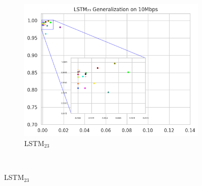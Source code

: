 \documentclass[a4paper,fleqn]{cas-sc}
\begin{document}
\begin{figure}[h!]
\begin{minipage}[t]{0.46\textwidth}
\begin{subfigure}[t]{0.33\textwidth}
				\includegraphics[draft=false, width=\textwidth]{./figs/Generalizacao-LSTM23-10Mbps.png} 
				\caption{LSTM$_{23}$}
				\label{fig:Generalizacao-LSTM23-10Mbps}
			\end{subfigure}%
			~%
			

\end{minipage}
\end{figure}
\end{document}
